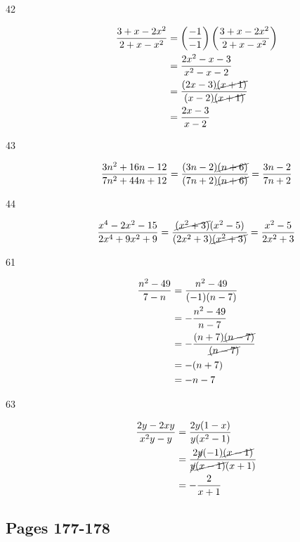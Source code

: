 \documentclass[fleqn,addpoints]{exam}
\begin{document}
\begin{description}
\item[42]
\begin{align*}
  \frac{3 + x - 2x^2}{2 + x - x^2} &= \left(\frac{-1}{-1} \right) \left( \frac{3 + x - 2x^2}{2 + x - x^2} \right) \\
  &= \frac{2x^2 - x - 3}{x^2 - x - 2} \\
  &= \frac{(2x - 3) \cancel{(x + 1)}} { (x - 2) \cancel{(x + 1)}  } \\
  &= \frac{2x - 3} {x - 2} \\
\end{align*}

\item[43]
\[ \frac{3n^2 + 16n - 12}{7n^2 + 44n + 12} = \frac{(3n - 2) \cancel{(n + 6)}} { (7n + 2) \cancel{(n + 6)} } 
= \frac{3n - 2} {7n + 2} \]

\item[44]
\[\frac{x^4 - 2x^2 - 15}{2x^4 + 9x^2 + 9} = \frac{\cancel{(x^2 + 3)} (x^2 - 5)  } { (2x^2 + 3) \cancel{(x^2 + 3)} } 
= \frac{x^2 - 5}{2x^2 + 3} \]

\item[61]
\begin{align*}
  \frac{n^2 - 49}{7 - n} &= \frac{n^2 - 49}{(-1)(n - 7)} \\
  &= - \frac{n^2 - 49}{n - 7} \\
  &= - \frac{(n + 7)\cancel{(n - 7)}}{\cancel{(n - 7)}} \\
  &= - (n + 7) \\
  &= -n - 7 \\
\end{align*}

\item[63]
\begin{align*}
  \frac{2y - 2xy}{x^2y - y} &= \frac{2y(1  - x)}{y(x^2 - 1)}\\
  &= \frac{2 \cancel{y} (-1) \cancel{(x - 1)}}{\cancel{y} \cancel{(x - 1)}(x+1)} \\
  &= -\frac{2}{x+1} \\
\end{align*}

\end{description}

\subsection{Pages 177-178}
\end{document}
